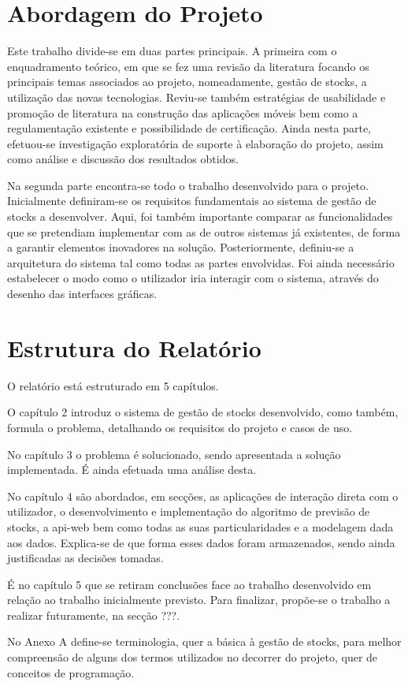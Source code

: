 %
%
\section{Abordagem do Projeto} \label{sec13}

Este trabalho divide-se em duas partes principais. A primeira com o enquadramento teórico, em que se fez uma revisão da literatura focando os principais temas associados ao projeto, nomeadamente, gestão de stocks, a utilização das novas tecnologias. Reviu-se também estratégias de usabilidade e promoção de literatura na construção das aplicações móveis bem como a regulamentação existente e possibilidade de certificação.
Ainda nesta parte, efetuou-se investigação exploratória de suporte à elaboração do projeto, assim como análise e discussão dos resultados obtidos.

Na segunda parte encontra-se todo o trabalho desenvolvido para o projeto. Inicialmente definiram-se os requisitos fundamentais ao sistema de gestão de stocks a desenvolver. Aqui, foi também importante comparar as funcionalidades que se pretendiam implementar com as de outros sistemas já existentes, de forma a garantir elementos inovadores na solução. Posteriormente, definiu-se a arquitetura do sistema tal como todas as partes envolvidas. Foi ainda necessário estabelecer o modo como o utilizador iria interagir com o sistema, através do desenho das interfaces gráficas.

%
%
\section{Estrutura do Relatório} \label{sec14}
O relatório está estruturado em 5 capítulos.

O capítulo 2 introduz o sistema de gestão de stocks desenvolvido, como também, formula o problema, detalhando os requisitos do projeto e casos de uso. 

No capítulo 3 o problema é solucionado, sendo apresentada a solução implementada. É ainda efetuada uma análise desta.

No capítulo 4 são abordados, em secções, as aplicações de interação direta com o utilizador, o desenvolvimento e implementação do algoritmo de previsão de stocks, a \gls{api-web} bem como todas as suas particularidades e a modelagem dada aos dados. Explica-se de que forma esses dados foram armazenados, sendo ainda justificadas as decisões tomadas. 

É no capítulo 5 que se retiram conclusões face ao trabalho desenvolvido em relação ao trabalho inicialmente previsto. Para finalizar, propõe-se o trabalho a realizar futuramente, na secção ???.

No Anexo A define-se terminologia, quer a básica à gestão de stocks, para melhor compreensão de alguns dos termos utilizados no decorrer do projeto, quer de conceitos de programação.

